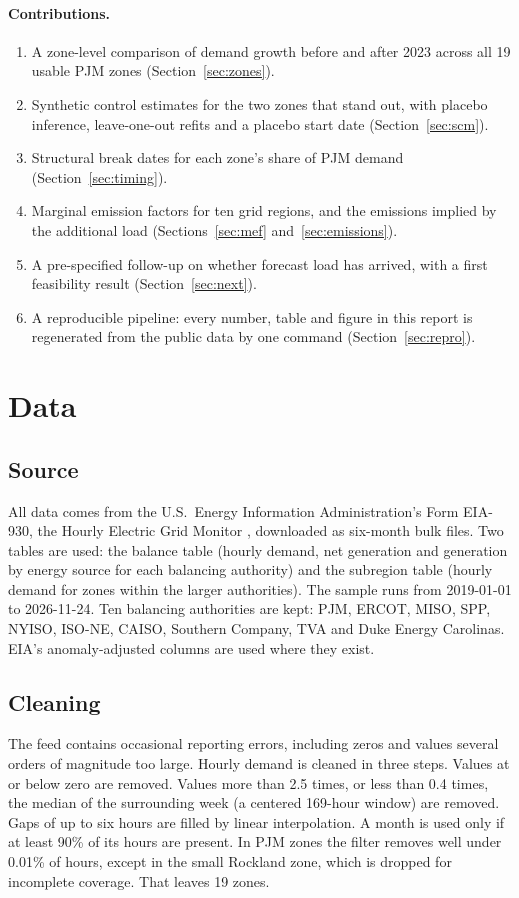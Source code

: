 \documentclass[11pt,a4paper]{article}
\begin{document}
\paragraph{Contributions.}
\begin{enumerate}[label=(\roman*)]
\item A zone-level comparison of demand growth before and after 2023 across all 19 usable PJM zones (Section~\ref{sec:zones}).
\item Synthetic control estimates for the two zones that stand out, with placebo inference, leave-one-out refits and a placebo start date (Section~\ref{sec:scm}).
\item Structural break dates for each zone's share of PJM demand (Section~\ref{sec:timing}).
\item Marginal emission factors for ten grid regions, and the emissions implied by the additional load (Sections~\ref{sec:mef} and~\ref{sec:emissions}).
\item A pre-specified follow-up on whether forecast load has arrived, with a first feasibility result (Section~\ref{sec:next}).
\item A reproducible pipeline: every number, table and figure in this report is regenerated from the public data by one command (Section~\ref{sec:repro}).
\end{enumerate}

\section{Data}

\subsection{Source}
All data comes from the U.S.\ Energy Information Administration's Form EIA-930, the Hourly Electric Grid Monitor \cite{eia930}, downloaded as six-month bulk files. Two tables are used: the balance table (hourly demand, net generation and generation by energy source for each balancing authority) and the subregion table (hourly demand for zones within the larger authorities). The sample runs from 2019-01-01 to 2026-11-24. Ten balancing authorities are kept: PJM, ERCOT, MISO, SPP, NYISO, ISO-NE, CAISO, Southern Company, TVA and Duke Energy Carolinas. EIA's anomaly-adjusted columns are used where they exist.

\subsection{Cleaning}
The feed contains occasional reporting errors, including zeros and values several orders of magnitude too large. Hourly demand is cleaned in three steps. Values at or below zero are removed. Values more than 2.5 times, or less than 0.4 times, the median of the surrounding week (a centered 169-hour window) are removed. Gaps of up to six hours are filled by linear interpolation. A month is used only if at least 90\% of its hours are present. In PJM zones the filter removes well under 0.01\% of hours, except in the small Rockland zone, which is dropped for incomplete coverage. That leaves 19 zones.
\end{document}
